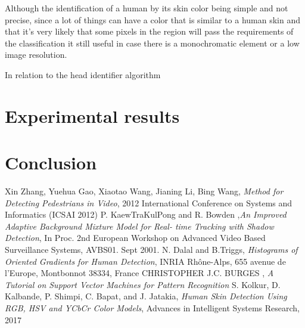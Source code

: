 \documentclass[conference]{IEEEtran}
\begin{document}
	Although the identification of a human by its skin color being simple and not precise, since a lot of things can have a color that is similar to a human skin and that it's very likely that some pixels in the region will pass the requirements of the classification it still useful in case there is a monochromatic element or a low image resolution.
	
	In relation to the head identifier algorithm 
	
	

\section{Experimental results}

\section{Conclusion}

\begin{thebibliography}{00}
 Xin Zhang, Yuehua Gao, Xiaotao Wang, Jianing Li, Bing Wang, \textit{Method for Detecting Pedestrians in Video}, 2012 International Conference on Systems and Informatics (ICSAI 2012) 
 P. KaewTraKulPong and R. Bowden ,\textit{An Improved Adaptive Background Mixture Model for Real-
time Tracking with Shadow Detection}, In Proc. 2nd European Workshop on Advanced Video Based Surveillance Systems, AVBS01. Sept 2001.
 N. Dalal and B.Triggs, \textit{Histograms of Oriented Gradients for Human Detection}, INRIA Rhône-Alps, 655 avenue de l’Europe, Montbonnot 38334, France 
 CHRISTOPHER J.C. BURGES , \textit{A Tutorial on Support Vector Machines for Pattern Recognition}
 S. Kolkur, D. Kalbande, P. Shimpi, C. Bapat, and J. Jatakia, \textit{Human Skin Detection Using RGB, HSV and YCbCr Color Models}, Advances in Intelligent Systems Research, 2017
\end{thebibliography}
\vspace{12pt}
\end{document}
